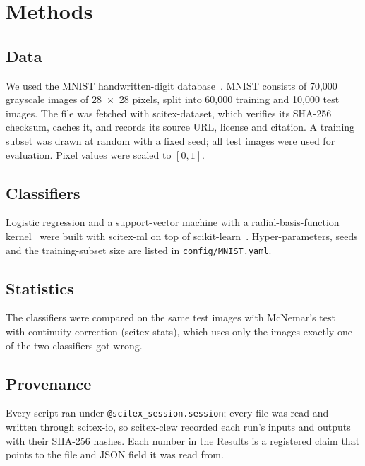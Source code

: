 \section{Methods}

\subsection{Data}
We used the MNIST handwritten-digit database~\citep{lecun1998gradient}.
MNIST consists of 70,000 grayscale images of 28~$\times$~28 pixels, split
into 60,000 training and 10,000 test images.
The file was fetched with scitex-dataset, which verifies its SHA-256
checksum, caches it, and records its source URL, license and citation.
A training subset was drawn at random with a fixed seed; all test images
were used for evaluation. Pixel values were scaled to $[0, 1]$.

\subsection{Classifiers}
Logistic regression and a support-vector machine with a radial-basis-function
kernel~\citep{cortes1995support} were built with scitex-ml on top of
scikit-learn~\citep{pedregosa2011scikit}. Hyper-parameters, seeds and the
training-subset size are listed in \texttt{config/MNIST.yaml}.

\subsection{Statistics}
The classifiers were compared on the same test images with McNemar's
test~\citep{mcnemar1947note} with continuity correction (scitex-stats),
which uses only the images exactly one of the two classifiers got wrong.

\subsection{Provenance}
Every script ran under \texttt{@scitex\_session.session}; every file was read
and written through scitex-io, so scitex-clew recorded each run's inputs and
outputs with their SHA-256 hashes. Each number in the Results is a registered
claim that points to the file and JSON field it was read from.

